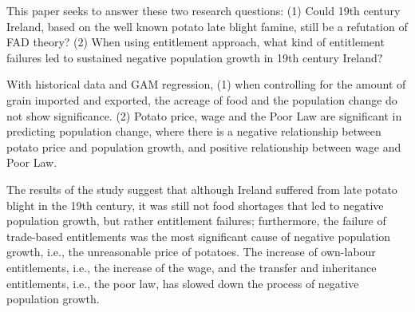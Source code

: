 \documentclass[a4paper,oneside,12pt]{book}
\begin{document}
This paper seeks to answer these two research questions: (1) Could 19th century Ireland, based on the well known potato late blight famine, still be a refutation of FAD theory? (2) When using entitlement approach, what kind of entitlement failures led to sustained negative population growth in 19th century Ireland?

With historical data and GAM regression, (1) when controlling for the amount of grain imported and exported, the acreage of food and the population change do not show significance. (2) Potato price, wage and the Poor Law are significant in predicting population change, where there is a negative relationship between potato price and population growth, and positive relationship between wage and Poor Law.

The results of the study suggest that although Ireland suffered from late potato blight in the 19th century, it was still not food shortages that led to negative population growth, but rather entitlement failures; furthermore, the failure of trade-based entitlements was the most significant cause of negative population growth, i.e., the unreasonable price of potatoes. The increase of own-labour entitlements, i.e., the increase of the wage, and the transfer and inheritance entitlements, i.e., the poor law,  has slowed down the process of negative population growth.

\newpage

\setlength{\parskip}{5pt}

\newpage \tableofcontents
\newpage \listoffigures
\newpage \listoftables

\newpage

\vspace{2cm}

\mainmatter






\newpage
{}



\appendix
\renewcommand{\thechapter}{A\arabic{chapter}}
\end{document}
